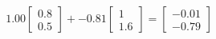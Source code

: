 \documentclass[preview]{standalone}
\begin{document}
\begin{align*}
1.00 \begin{bmatrix} 0.8 \\ 0.5 \end{bmatrix} + -0.81 \begin{bmatrix} 1 \\ 1.6 \end{bmatrix} = \begin{bmatrix} -0.01 \\ -0.79 \end{bmatrix}
\end{align*}
\end{document}
